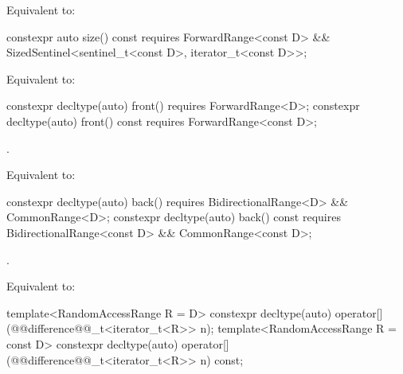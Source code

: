 \begin{itemdescr}
\pnum
\effects Equivalent to: 
\end{itemdescr}

%
\begin{itemdecl}
constexpr auto size() const requires ForwardRange<const D> &&
SizedSentinel<sentinel_t<const D>, iterator_t<const D>>;
\end{itemdecl}

\begin{itemdescr}
\pnum
\effects Equivalent to: 
\end{itemdescr}

%
\begin{itemdecl}
constexpr decltype(auto) front() requires ForwardRange<D>;
constexpr decltype(auto) front() const requires ForwardRange<const D>;
\end{itemdecl}

\begin{itemdescr}
\pnum
\requires {}.

\pnum
\effects Equivalent to: 
\end{itemdescr}

%
\begin{itemdecl}
constexpr decltype(auto) back()
  requires BidirectionalRange<D> && CommonRange<D>;
constexpr decltype(auto) back() const
  requires BidirectionalRange<const D> && CommonRange<const D>;
\end{itemdecl}

\begin{itemdescr}
\pnum
\requires {}.

\pnum
\effects Equivalent to: 
\end{itemdescr}

%
\begin{itemdecl}
template<RandomAccessRange R = D>
constexpr decltype(auto) operator[](@@difference@@_t<iterator_t<R>> n);
template<RandomAccessRange R = const D>
constexpr decltype(auto) operator[](@@difference@@_t<iterator_t<R>> n) const;
\end{itemdecl}

